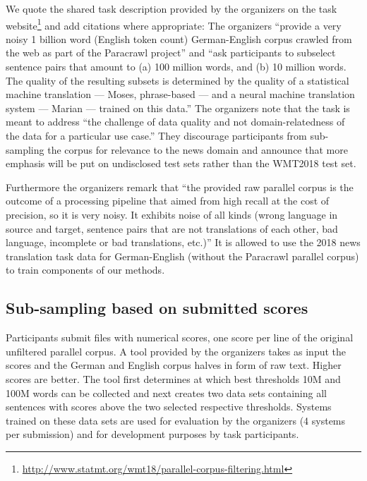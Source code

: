 \documentclass[11pt,a4paper]{article}
\begin{document}

We quote the shared task description provided by the organizers on the task website\footnote{\url{http://www.statmt.org/wmt18/parallel-corpus-filtering.html}} and add citations where appropriate:
The organizers ``provide a very noisy 1 billion word (English token count) German-English corpus crawled from the web as part of the Paracrawl project'' and ``ask participants to subselect sentence pairs that amount to (a) 100 million words, and (b) 10 million words. The quality of the resulting subsets is determined by the quality of a statistical machine translation --- Moses, phrase-based \cite{conf/acl/KoehnHBCFBCSMZDBCH07} --- and a neural machine translation system --- Marian \cite{marian} --- trained on this data.''
The organizers note that the task is meant to address ``the challenge of data quality and not domain-relatedness of the data for a particular use case.'' 
They discourage participants from sub-sampling the corpus for relevance to the news domain and announce that more emphasis will be put on undisclosed test sets rather than the WMT2018 test set.

Furthermore the organizers remark that ``the provided raw parallel corpus is the outcome of a processing pipeline that aimed from high recall at the cost of precision, so it is very noisy. It exhibits noise of all kinds (wrong language in source and target, sentence pairs that are not translations of each other, bad language, incomplete or bad translations, etc.)'' 
It is allowed to use the 2018 news translation task data for German-English (without the Paracrawl parallel corpus) to train components of our methods.

\subsection{Sub-sampling based on submitted scores}
Participants submit files with numerical scores, one score per line of the original unfiltered parallel corpus. A tool provided by the organizers takes as input the scores and the German and English corpus halves in form of raw text. Higher scores are better. The tool first determines at which best thresholds 10M and 100M words can be collected and next creates two data sets containing all sentences with scores above the two selected respective thresholds. Systems trained on these data sets are used for evaluation by the organizers (4 systems per submission) and for development purposes by task participants. 
\end{document}
